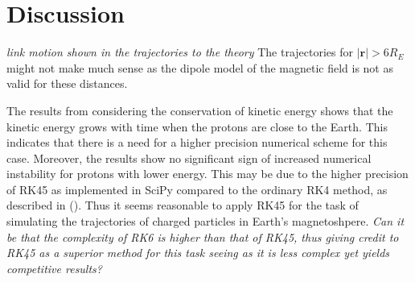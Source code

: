 \section{Discussion}
\textit{link motion shown in the trajectories to the theory}
The trajectories for $|\bm{r}| > 6R_E$ might not make much sense as the dipole model of the magnetic field is not as valid for these distances.

The results from considering the conservation of kinetic energy shows that the kinetic energy grows with time when the protons are close to the Earth. 
This indicates that there is a need for a higher precision numerical scheme for this case.
Moreover, the results show no significant sign of increased numerical instability for protons with lower energy. 
This may be due to the higher precision of RK45 as implemented in SciPy compared to the ordinary RK4 method, as described in (\cite{DORMAND198019}).
Thus it seems reasonable to apply RK45 for the task of simulating the trajectories of charged particles in Earth's magnetoshpere. 
\textit{Can it be that the complexity of RK6 is higher than that of RK45, thus giving credit to RK45 as a superior method for this task seeing as it is less complex yet yields competitive results?}

